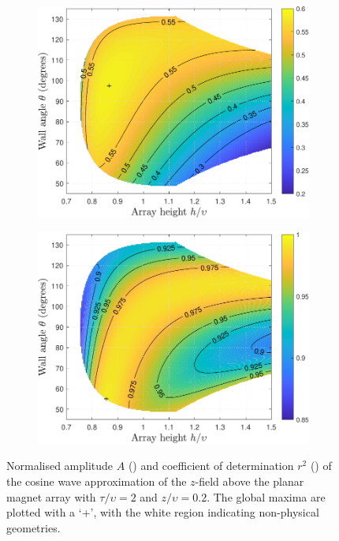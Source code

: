 \begin{figure}
	\centering
	\begin{subfigure}{0.8\textwidth}
		\centering
		\includegraphics[width=\linewidth]{p3/p3FIG12a}
		\subcaption{}
		\label{subfig:p3planarHalbach_amp}
	\end{subfigure}
	
	\vfill
	
	\begin{subfigure}{0.8\textwidth}
		\centering
		\includegraphics[width=\linewidth]{p3/p3FIG12b}
		\subcaption{}
		\label{subfig:p3planarHalbach_rsq}
	\end{subfigure}
	\caption{Normalised amplitude \(A\) () and coefficient of determination \(r^2\) () of the cosine wave approximation of the \(z\)-field above the planar magnet array with \(\tau/\upsilon=2\) and \(z/\upsilon = 0.2\). The global maxima are plotted with a `+', with the white region indicating non-physical geometries.}
	\label{fig:p3planarHalbachData}
\end{figure}

